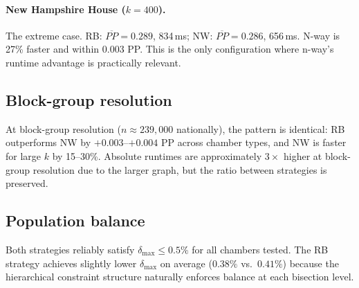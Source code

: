 \paragraph{New Hampshire House ($k{=}400$).}
The extreme case.  RB: $\overline{PP} = 0.289$, 834\,ms;
NW: $\overline{PP} = 0.286$, 656\,ms.  N-way is 27\% faster and within 0.003
PP.  This is the only configuration where n-way's runtime advantage is
practically relevant.

\subsection{Block-group resolution}

At block-group resolution ($n \approx 239{,}000$ nationally), the pattern is
identical: RB outperforms NW by $+0.003$--$+0.004$ PP across chamber types,
and NW is faster for large $k$ by 15--30\%.  Absolute runtimes are
approximately $3\times$ higher at block-group resolution due to the larger
graph, but the ratio between strategies is preserved.

\subsection{Population balance}

Both strategies reliably satisfy $\delta_{\max} \leq 0.5\%$ for all
chambers tested.  The RB strategy achieves slightly lower $\delta_{\max}$
on average ($0.38\%$ vs.\ $0.41\%$) because the hierarchical constraint
structure naturally enforces balance at each bisection level.
